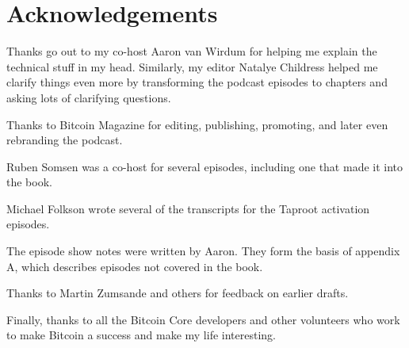 \chapter{Acknowledgements}

Thanks go out to my co-host Aaron van Wirdum for helping me explain the technical stuff in my head. Similarly, my editor Natalye Childress helped me clarify things even more by transforming the podcast episodes to chapters and asking lots of clarifying questions.

Thanks to Bitcoin Magazine for editing, publishing, promoting, and later even rebranding the podcast.

Ruben Somsen was a co-host for several episodes, including one that made it into the book.

Michael Folkson wrote several of the transcripts for the Taproot activation episodes.

The episode show notes were written by Aaron. They form the basis of appendix A, which describes episodes not covered in the book.

Thanks to Martin Zumsande and others for feedback on earlier drafts.

Finally, thanks to all the Bitcoin Core developers and other volunteers who work to make Bitcoin a success and make my life interesting.

\newpage

\ %

\newpage
